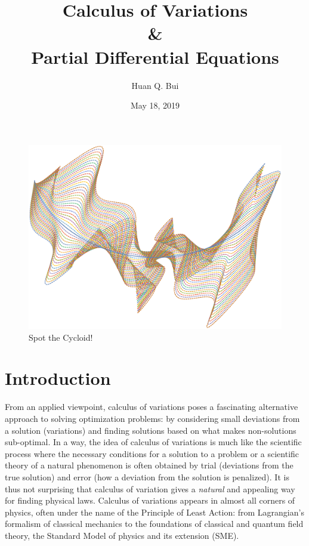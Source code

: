 \documentclass{article}
\title{{Calculus of Variations}\\{\&}\\{Partial Differential Equations}}
\author{Huan Q. Bui}
\date{May 18, 2019}
\begin{document}
\maketitle
\begin{figure}[h!]
\centering
\includegraphics[scale=0.53,angle=270]{intro.eps}
\captionsetup{labelformat=empty}
\caption{Spot the Cycloid!}
\end{figure}



\newpage
\tableofcontents
\newpage
{}





\section{Introduction}

\noindent From an applied viewpoint, calculus of variations poses a fascinating alternative approach to solving optimization problems: by considering small deviations from a solution (variations) and finding solutions based on what makes non-solutions sub-optimal. In a way, the idea of calculus of variations is much like the scientific process where the necessary conditions for a solution to a problem or a scientific theory of a natural phenomenon is often obtained by trial (deviations from the true solution) and error (how a deviation from the solution is penalized). It is thus not surprising that calculus of variation gives a \textit{natural} and appealing way for finding physical laws. Calculus of variations appears in almost all corners of physics, often under the name of the Principle of Least Action: from Lagrangian's formalism of classical mechanics to the foundations of classical and quantum field theory, the Standard Model of physics and its extension (SME). \\
\end{document}
